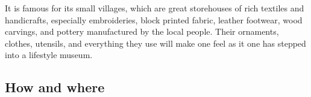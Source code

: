 It is famous for its small villages, which are great storehouses of rich textiles and handicrafts, especially embroideries, block printed fabric, leather footwear, wood carvings, and pottery manufactured by the local people. Their ornaments, clothes, utensils, and everything they use will make one feel as it one has stepped into a lifestyle museum.


\subsection{How and where} %
\label{sub:haw}







